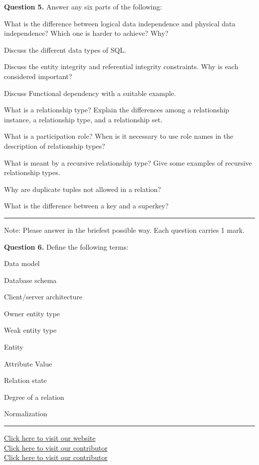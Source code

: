 \documentclass[11pt,a4paper]{article}
\begin{document}
\medskip\noindent\textbf{Question 5.} Answer any six parts of the following:
\begin{parts}
  \item What is the difference between logical data independence and physical data independence? Which one is harder to achieve? Why?
  \item Discuss the different data types of SQL.
  \item Discuss the entity integrity and referential integrity constraints. Why is each considered important?
  \item Discuss Functional dependency with a suitable example.
  \item What is a relationship type? Explain the differences among a relationship instance, a relationship type, and a relationship set.
  \item What is a participation role? When is it necessary to use role names in the description of relationship types?
  \item What is meant by a recursive relationship type? Give some examples of recursive relationship types.
  \item Why are duplicate tuples not allowed in a relation?
  \item What is the difference between a key and a superkey?
\end{parts}

\bigskip{}
\rule{\linewidth}{0.4pt}\smallskip

Note: Please answer in the briefest possible way. Each question carries 1 mark.

\medskip\noindent\textbf{Question 6.} Define the following terms:
\begin{parts}
  \item Data model
  \item Database schema
  \item Client/server architecture
  \item Owner entity type
  \item Weak entity type
  \item Entity
  \item Attribute Value
  \item Relation state
  \item Degree of a relation
  \item Normalization
\end{parts}

\vfill
\rule{\linewidth}{0.4pt}
\begin{center}\small
\href{https://bhu-exam.vercel.app/}{Click here to visit our website}\\[4pt]\href{https://me-aryan.vercel.app/}{Click here to visit our contributor}\\[4pt]\href{https://quashan-me.vercel.app/}{Click here to visit our contributor}
\end{center}
\end{document}

